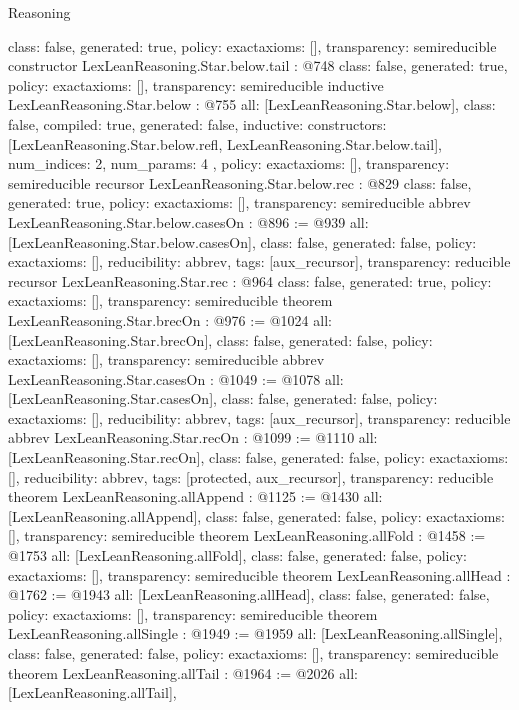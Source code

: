 \begin{lexlean}{Reasoning}
\begin{coremodule}
{  class: false,
  generated: true,
  policy: exact{axioms: []},
  transparency: semireducible
}
constructor LexLeanReasoning.Star.below.tail : @748 {
  class: false,
  generated: true,
  policy: exact{axioms: []},
  transparency: semireducible
}
inductive LexLeanReasoning.Star.below : @755 {
  all: [LexLeanReasoning.Star.below],
  class: false,
  compiled: true,
  generated: false,
  inductive: {
    constructors: [LexLeanReasoning.Star.below.refl, LexLeanReasoning.Star.below.tail],
    num_indices: 2,
    num_params: 4
  },
  policy: exact{axioms: []},
  transparency: semireducible
}
recursor LexLeanReasoning.Star.below.rec : @829 {
  class: false,
  generated: true,
  policy: exact{axioms: []},
  transparency: semireducible
}
abbrev LexLeanReasoning.Star.below.casesOn : @896 := @939 {
  all: [LexLeanReasoning.Star.below.casesOn],
  class: false,
  generated: false,
  policy: exact{axioms: []},
  reducibility: abbrev{},
  tags: [aux_recursor],
  transparency: reducible
}
recursor LexLeanReasoning.Star.rec : @964 {
  class: false,
  generated: true,
  policy: exact{axioms: []},
  transparency: semireducible
}
theorem LexLeanReasoning.Star.brecOn : @976 := @1024 {
  all: [LexLeanReasoning.Star.brecOn],
  class: false,
  generated: false,
  policy: exact{axioms: []},
  transparency: semireducible
}
abbrev LexLeanReasoning.Star.casesOn : @1049 := @1078 {
  all: [LexLeanReasoning.Star.casesOn],
  class: false,
  generated: false,
  policy: exact{axioms: []},
  reducibility: abbrev{},
  tags: [aux_recursor],
  transparency: reducible
}
abbrev LexLeanReasoning.Star.recOn : @1099 := @1110 {
  all: [LexLeanReasoning.Star.recOn],
  class: false,
  generated: false,
  policy: exact{axioms: []},
  reducibility: abbrev{},
  tags: [protected, aux_recursor],
  transparency: reducible
}
theorem LexLeanReasoning.allAppend : @1125 := @1430 {
  all: [LexLeanReasoning.allAppend],
  class: false,
  generated: false,
  policy: exact{axioms: []},
  transparency: semireducible
}
theorem LexLeanReasoning.allFold : @1458 := @1753 {
  all: [LexLeanReasoning.allFold],
  class: false,
  generated: false,
  policy: exact{axioms: []},
  transparency: semireducible
}
theorem LexLeanReasoning.allHead : @1762 := @1943 {
  all: [LexLeanReasoning.allHead],
  class: false,
  generated: false,
  policy: exact{axioms: []},
  transparency: semireducible
}
theorem LexLeanReasoning.allSingle : @1949 := @1959 {
  all: [LexLeanReasoning.allSingle],
  class: false,
  generated: false,
  policy: exact{axioms: []},
  transparency: semireducible
}
theorem LexLeanReasoning.allTail : @1964 := @2026 {
  all: [LexLeanReasoning.allTail],
}
\end{coremodule}
\end{lexlean}
